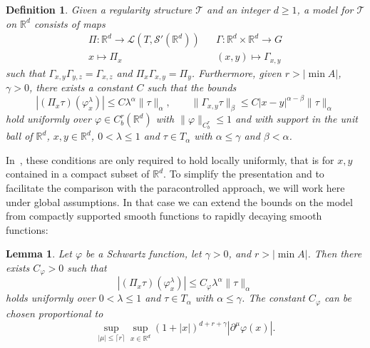 \documentclass[a4paper,11pt]{article}
\newtheorem{lemma}[theorem]{Lemma}
\newtheorem{definition}[theorem]{Definition}
\theoremstyle{remark}
\newcommand{\R}{\mathbb{R}}
\renewcommand{\le}{\leqslant}
\newcommand{\CS}{\ensuremath{\mathscr{S}}}
\begin{document}
\begin{definition}
  Given a regularity structure $\mathcal{T}$ and an integer $d \geqslant 1$, a
  model for $\mathcal{T}$ on $\R^{d}$ consists of maps
  \[ \begin{array}{ccc}
       \Pi :\R^{d} \rightarrow \mathcal{L} ( T,\CS' (
       \R^{d} ) ) &  & \Gamma :\R^{d} \times \R^{d}
       \rightarrow G\\
       x \mapsto \Pi_{x} &  & ( x,y ) \mapsto \Gamma_{x,y}
     \end{array} \]
  such that $\Gamma_{x,y} \Gamma_{y,z} = \Gamma_{x,z}$ and $\Pi_{x}
  \Gamma_{x,y} = \Pi_{y}$. Furthermore, given $r> | \min  A |$, %
  $\gamma >0$, there exists a constant $C$ such that the bounds
  \[
     | ( \Pi_{x} \tau ) ( \varphi^{\lambda}_{x} ) | \leqslant C \lambda^{\alpha} \| \tau \|_{\alpha} , \hspace{2em} \| \Gamma_{x,y} \tau  \|_{\beta} \leqslant C | x-y |^{\alpha - \beta} \| \tau \|_{\alpha}
  \]
  hold uniformly over $\varphi \in C^{r}_b ( \R^{d} )$ with $\| \varphi
  \|_{C^{r}_b} \leqslant 1$ and with support in the unit ball of $\R^{d}$,
  $x,y  \in \R^d$, $0< \lambda \leqslant 1$ and $\tau \in
  T_{\alpha}$ with $\alpha \leqslant \gamma$ and $\beta < \alpha$.
\end{definition}

In~\cite{Hairer2013a}, these conditions are only required to hold locally uniformly, that is for $x,y$ contained in a compact subset of $\R^d$. To simplify the presentation and to facilitate the comparison with the paracontrolled approach, we will work here under global assumptions. In that case we can extend the bounds on the model from compactly supported smooth functions to rapidly decaying smooth functions:

\begin{lemma}\label{lem:Pi acting on Schwartz}
   Let $\varphi$ be a Schwartz function, let $\gamma > 0$, and $r > |\min A|$. Then there exists $C_\varphi > 0$ such that
   \[
      |(\Pi_x \tau)(\varphi^\lambda_x)| \leqslant C_\varphi \lambda^{\alpha} \| \tau\|_\alpha
   \]
   holds uniformly over $0< \lambda \leqslant 1$ and $\tau \in T_{\alpha}$ with $\alpha \leqslant \gamma$. The constant $C_\varphi$ can be chosen proportional to
   \[
      \sup_{|\mu|\le \lceil r\rceil}\sup_{x \in \R^d} (1+|x|)^{d+r+\gamma} |\partial^\mu \varphi(x)|.
   \]
\end{lemma}
\end{document}

